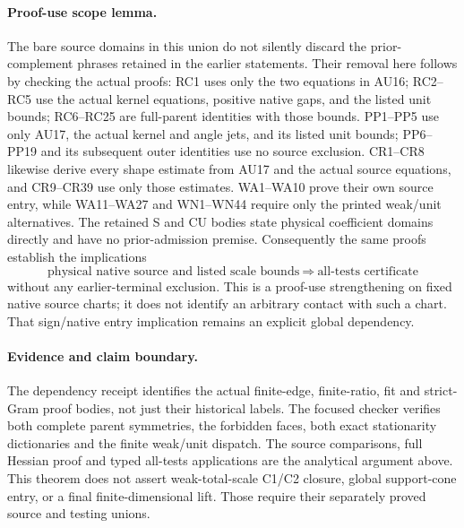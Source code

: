 \paragraph{Proof-use scope lemma.}
The bare source domains in this union do not silently discard
the prior-complement phrases retained in the earlier statements.
Their removal here follows by checking the actual proofs:
RC1 uses only the two equations in AU16; RC2--RC5 use the actual
kernel equations, positive native gaps, and the listed unit bounds;
RC6--RC25 are full-parent identities with those bounds.
PP1--PP5 use only AU17, the actual kernel and angle jets, and its
listed unit bounds; PP6--PP19 and its subsequent outer identities
use no source exclusion.
CR1--CR8 likewise derive every shape estimate from AU17 and the
actual source equations, and CR9--CR39 use only those estimates.
WA1--WA10 prove their own source entry, while WA11--WA27 and
WN1--WN44 require only the printed weak/unit alternatives.
The retained S and CU bodies state physical coefficient domains
directly and have no prior-admission premise.
Consequently the same proofs establish the implications
\[
 \text{physical native source and listed scale bounds}
 \ \Longrightarrow\ \text{all-tests certificate}
 \tag{AU19}
\]
without any earlier-terminal exclusion.
This is a proof-use strengthening on fixed native source charts;
it does not identify an arbitrary contact with such a chart.
That sign/native entry implication remains an explicit global
dependency.

\paragraph{Evidence and claim boundary.}
The dependency receipt identifies the actual finite-edge,
finite-ratio, fit and strict-Gram proof bodies, not just their
historical labels. The focused checker verifies both complete
parent symmetries, the forbidden faces, both exact stationarity
dictionaries and the finite weak/unit dispatch.
The source comparisons, full Hessian proof and typed all-tests
applications are the analytical argument above.
This theorem does not assert weak-total-scale C1/C2 closure,
global support-cone entry, or a final finite-dimensional lift.
Those require their separately proved source and testing unions.
